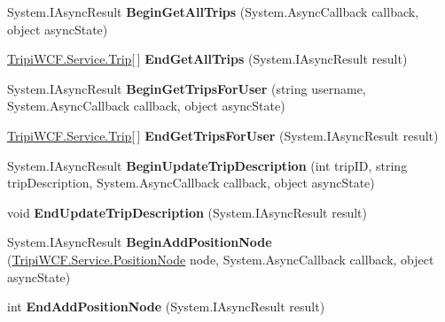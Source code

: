 \begin{DoxyCompactItemize}
\item 
\hypertarget{interface_i_trip_service_ab525f5aa33b4435b09cc95e931f2a31d}{
System.IAsyncResult {\bfseries BeginGetAllTrips} (System.AsyncCallback callback, object asyncState)}
\label{interface_i_trip_service_ab525f5aa33b4435b09cc95e931f2a31d}

\item 
\hypertarget{interface_i_trip_service_a9d8cd1ccbde0f4a84bf990c2287ab336}{
\hyperlink{class_tripi_w_c_f_1_1_service_1_1_trip}{TripiWCF.Service.Trip}\mbox{[}$\,$\mbox{]} {\bfseries EndGetAllTrips} (System.IAsyncResult result)}
\label{interface_i_trip_service_a9d8cd1ccbde0f4a84bf990c2287ab336}

\item 
\hypertarget{interface_i_trip_service_abdab35d0a03c32a7fcdb9b7e21840466}{
System.IAsyncResult {\bfseries BeginGetTripsForUser} (string username, System.AsyncCallback callback, object asyncState)}
\label{interface_i_trip_service_abdab35d0a03c32a7fcdb9b7e21840466}

\item 
\hypertarget{interface_i_trip_service_ad57b12311e0753b7f3b1c47f2da219eb}{
\hyperlink{class_tripi_w_c_f_1_1_service_1_1_trip}{TripiWCF.Service.Trip}\mbox{[}$\,$\mbox{]} {\bfseries EndGetTripsForUser} (System.IAsyncResult result)}
\label{interface_i_trip_service_ad57b12311e0753b7f3b1c47f2da219eb}

\item 
\hypertarget{interface_i_trip_service_a92fb1d528f49e637e6a404ec7067451d}{
System.IAsyncResult {\bfseries BeginUpdateTripDescription} (int tripID, string tripDescription, System.AsyncCallback callback, object asyncState)}
\label{interface_i_trip_service_a92fb1d528f49e637e6a404ec7067451d}

\item 
\hypertarget{interface_i_trip_service_aeed5f3cb84fc59f5eb538acd6756a526}{
void {\bfseries EndUpdateTripDescription} (System.IAsyncResult result)}
\label{interface_i_trip_service_aeed5f3cb84fc59f5eb538acd6756a526}

\item 
\hypertarget{interface_i_trip_service_a740f261ae2d3cdb5d57473f05d7403da}{
System.IAsyncResult {\bfseries BeginAddPositionNode} (\hyperlink{class_tripi_w_c_f_1_1_service_1_1_position_node}{TripiWCF.Service.PositionNode} node, System.AsyncCallback callback, object asyncState)}
\label{interface_i_trip_service_a740f261ae2d3cdb5d57473f05d7403da}

\item 
\hypertarget{interface_i_trip_service_a5f76b4a7687512857c9de09ae480d534}{
int {\bfseries EndAddPositionNode} (System.IAsyncResult result)}
\label{interface_i_trip_service_a5f76b4a7687512857c9de09ae480d534}


\end{DoxyCompactItemize}
